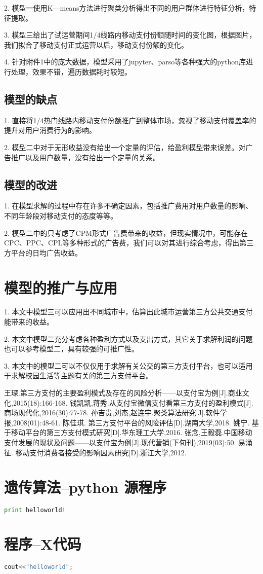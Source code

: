\documentclass[withoutpreface,bwprint]{cumcmthesis} %
\begin{document}
2. 模型一使用K—means方法进行聚类分析得出不同的用户群体进行特征分析，特征提取。   

3. 模型三给出了试运营期间1/4线路内移动支付份额随时间的变化图，根据图片，我们拟合了移动支付正式运营以后，移动支付份额的变化。

4. 针对附件1中的庞大数据，模型采用了jupyter、parso等各种强大的python库进行处理，效果不错，遍历数据耗时较短。
\subsection{模型的缺点}
1. 直接将1/4热门线路内移动支付份额推广到整体市场，忽视了移动支付覆盖率的提升对用户消费行为的影响。

2. 模型二中对于无形收益没有给出一个定量的评估，给盈利模型带来误差。对广告推广以及用户数量，没有给出一个定量的关系。
\subsection{模型的改进}
1. 在模型求解的过程中存在许多不确定因素，包括推广费用对用户数量的影响、不同年龄段对移动支付的态度等等。

2. 模型二中的只考虑了CPM形式广告费带来的收益，但现实情况中，可能存在CPC、PPC、CPL等多种形式的广告费，我们可以对其进行综合考虑，得出第三方平台的日均广告收益。
\section{模型的推广与应用}
1. 本文中模型三可以应用出不同城市中，估算出此城市运营第三方公共交通支付能带来的收益。

2. 本文中模型二充分考虑各种盈利方式以及支出方式，其它关于求解利润的问题也可以参考模型二，具有较强的可推广性。

3. 本文中的模型二可以不仅仅用于求解有关公交的第三方支付平台，也可以适用于求解校园生活等主题有关的第三方支付平台。



\begin{thebibliography}{9}%
  王琛.第三方支付的主要盈利模式及存在的风险分析——以支付宝为例[J].商业文化,2015(18):166-168.
 钱凯凯,蒋秀.从支付宝微信支付看第三方支付的盈利模式[J].商场现代化,2016(30):77-78.
 孙吉贵,刘杰,赵连宇.聚类算法研究[J].软件学报,2008(01):48-61.
 陈佳琪. 第三方支付平台的风险评估[D].湖南大学,2018.
 姚宁. 基于移动平台的第三方支付模式研究[D].华东理工大学,2016.
 张念,王毅磊.中国移动支付发展的现状及问题——以支付宝为例[J].现代营销(下旬刊),2019(03):50.
 易涌征. 移动支付消费者接受的影响因素研究[D].浙江大学,2012.
 
\end{thebibliography}

\newpage
\begin{appendices}
\section{遗传算法--python 源程序}
\begin{lstlisting}[language=python]
print helloworld!
 \end{lstlisting}
 \section{程序--X代码}
\begin{lstlisting}[language=c]
cout<<"helloworld";
 \end{lstlisting}
\end{appendices}
\end{document}
